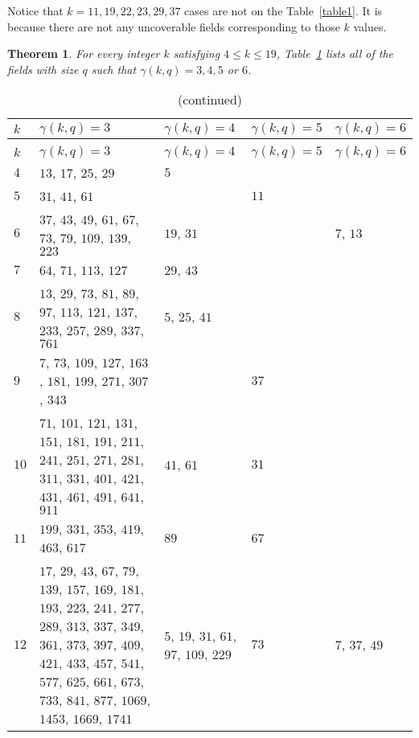 \documentclass[11pt,reqno]{amsart}
\newtheorem{thm}{Theorem}[section]
\begin{document}
Notice that $k=11, 19, 22, 23, 29, 37$ cases are not on the Table~\ref{table1}. It is because there are not any uncoverable fields corresponding to those $k$ values.

\begin{thm} \label{table2-thm} 
For every integer $k$ satisfying $4 \leqslant k \leqslant 19$, Table~\ref{table2} lists all of the fields with size $q$ such that $\gamma(k,q)=3,4,5$ or $6$. 
\end{thm}
 
\begin{longtable}{ | p{0.5cm} | p{9cm} | p{2.5cm} | p{2.1cm} | p{2.1cm} | }
\caption{Fields} \label{table2} \\
\hline
\boldmath$k$ & \boldmath$\gamma(k,q)= 3$ & \boldmath$\gamma(k,q)= 4$ & \boldmath$\gamma(k,q)= 5$ & \boldmath$\gamma(k,q)= 6$ \\
\hline
\endfirsthead
\caption[]{(continued)} \\
\hline
\boldmath$k$ & \boldmath$\gamma(k,q)= 3$ & \boldmath$\gamma(k,q)= 4$ & \boldmath$\gamma(k,q)= 5$ & \boldmath$\gamma(k,q)= 6$ \\
\hline
\endhead
$4$ & $13$, $17$, $25$, $29$ & $5$ & \ \ & \ \  \\
\hline
$5$ & $31$, $41$, $61$ & \ \  & $11$ & \ \  \\
\hline
$6$ & $37$, $43$, $49$, $61$, $67$, $73$, $79$, $109$, $139$, $223$ & $19$, $31$ & \ \ & $7$, $13$ \\
\hline
$7$ & $64$, $71$, $113$, $127$ & $29$, $43$ & \ \ & \ \  \\
\hline
$8$ & $13$, $29$, $73$, $81$, $89$, $97$, $113$, $121$, $137$, $233$, $257$, $289$, $337$, $761$ & $5$, $25$, $41$ & \ \  & \ \  \\
\hline
$9$ & $7$, $73$, $109$, $127$, $163$, $181$, $199$, $271$, $307$, $343$ &  \ \  &  $37$ & \ \  \\
\hline
$10$ & $71$, $101$, $121$, $131$, $151$, $181$, $191$, $211$, $241$, $251$, $271$, $281$, $311$, $331$, $401$, $421$, $431$, $461$, $491$, $641$, $911$ & $41$, $61$ & $31$ & \ \  \\
\hline
$11$ & $199$, $331$, $353$, $419$, $463$, $617$ & $89$ & $67$ & \ \  \\
\hline
$12$ & $17$, $29$, $43$, $67$, $79$, $139$, $157$, $169$, $181$, $193$, $223$, $241$, $277$, $289$, $313$, $337$, $349$, $361$, $373$, $397$, $409$, $421$, $433$, $457$, $541$, $577$, $625$, $661$, $673$, $733$, $841$, $877$, $1069$, $1453$, $1669$, $1741$ & $5$, $19$, $31$, $61$, $97$, $109$, $229$ &  $73$ & $7$,  $37$, $49$ \\

\end{longtable}
\end{document}

